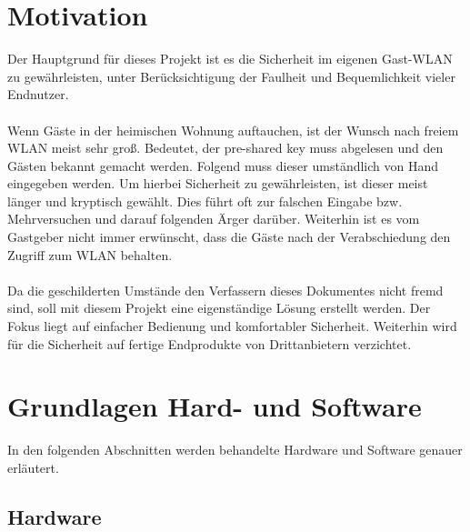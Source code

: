\documentclass[a4paper,11pt,singlespacing]{article}
\begin{document}
    	\pagestyle{empty}
    	\tableofcontents
    	\cleardoublepage
    	\pagestyle{plain}

    \section{Motivation}
    	Der Hauptgrund für dieses Projekt ist es die Sicherheit im eigenen Gast-WLAN zu gewährleisten, unter Berücksichtigung der Faulheit und Bequemlichkeit vieler Endnutzer. \\ \\
    	Wenn Gäste in der heimischen Wohnung auftauchen, ist der Wunsch nach freiem WLAN meist sehr groß. Bedeutet, der pre-shared key muss abgelesen und den Gästen bekannt gemacht werden. Folgend muss dieser umständlich von Hand eingegeben werden. Um hierbei Sicherheit zu gewährleisten, ist dieser meist länger und kryptisch gewählt. Dies führt oft zur falschen Eingabe bzw. Mehrversuchen und darauf folgenden Ärger darüber. Weiterhin ist es vom Gastgeber nicht immer erwünscht, dass die Gäste nach der Verabschiedung den Zugriff zum WLAN behalten. \\ \\
    	Da die geschilderten Umstände den Verfassern dieses Dokumentes nicht fremd sind, soll mit diesem Projekt eine eigenständige Lösung erstellt werden. Der Fokus liegt auf einfacher Bedienung und komfortabler Sicherheit. Weiterhin wird für die Sicherheit auf fertige Endprodukte von Drittanbietern verzichtet. 
    			
    \section{Grundlagen Hard- und Software}
    \label{sec:Grundlagen_Hard-und_Software}
      	In den folgenden Abschnitten werden behandelte Hardware und Software genauer erläutert.
      	\subsection{Hardware}
\end{document}
